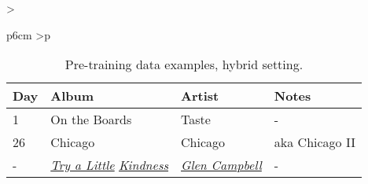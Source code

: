 \documentclass[11pt]{article}
\begin{document}
\begin{table*}[t]
{\begin{tabular}{
       >{\raggedright}p{6cm}
       >{}p{\dimexpr{}\fboxsep-4.5cm\relax}
    }
\begin{tabular}[t]{
         >{\raggedright}p{1cm}
         >{\raggedright}p{2.5cm}
         >{\raggedright}p{2.2cm}
         >{}p{2.3cm}
      }
      \toprule
      Day&Album&Artist&Notes\\
      \midrule
      1& On the Boards&Taste&-\\
      26&Chicago&Chicago&aka Chicago II\\
      -&\underline{\it Try a Little} \underline{\it Kindness}&\underline{\it Glen Campbell}&-\\
      \bottomrule
      \end{tabular}\vspace{3pt}\\
    \bottomrule
    \end{tabular}}
    \caption{Pre-training data examples, hybrid setting.}
    \label{tab:data_example_hybrid}
\end{table*}  
\end{document}
